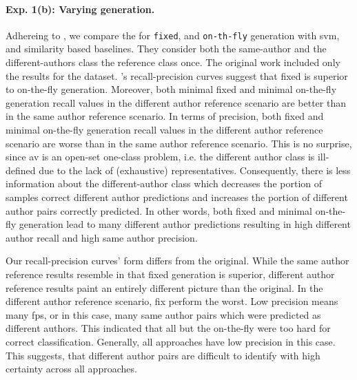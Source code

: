 \paragraph{Exp. 1(b): Varying \imp{} generation.}

Adhereing to \citet{koppel_determining_2014}, we compare the \impAppr{} for \texttt{fixed}, and \texttt{on-th-fly} \imp{} generation with \ac{svm}, and similarity based baselines.
They consider both the same-author and the different-authors class the reference class once.
The original work included only the results for the \dataBlog{} dataset.
\citet{koppel_determining_2014}'s recall-precision curves suggest that fixed is superior to on-the-fly \imp{} generation.
Moreover, both minimal fixed and minimal on-the-fly \imp{} generation recall values in the different author reference scenario are better than in the same author reference scenario.
In terms of precision, both fixed and minimal on-the-fly \imp{} generation recall values in the different author reference scenario are worse than in the same author reference scenario. %
This is no surprise, since \ac{av} is an open-set one-class problem, i.e. the different author class is ill-defined due to the lack of (exhaustive) representatives.
Consequently, there is less information about the different-author class which decreases the portion of samples correct different author predictions and increases the portion of different author pairs correctly predicted.
In other words, both fixed and minimal on-the-fly \imp{} generation lead to many different author predictions resulting in high different author recall and high same author precision.

Our recall-precision curves' form differs from the original.
While the same author reference results resemble \citet{koppel_determining_2014} in that fixed \imp{} generation is superior, different author reference results paint an entirely different picture than the original.
In the different author reference scenario, fix \imps{} perform the worst. 
Low precision means many \acp{fp}, or in this case, many same author pairs which were predicted as different authors.
This indicated that all but the on-the-fly \imps{} were too hard for correct classification.
Generally, all approaches have low precision in this case.
This suggests, that different author pairs are difficult to identify with high certainty across all approaches. 

